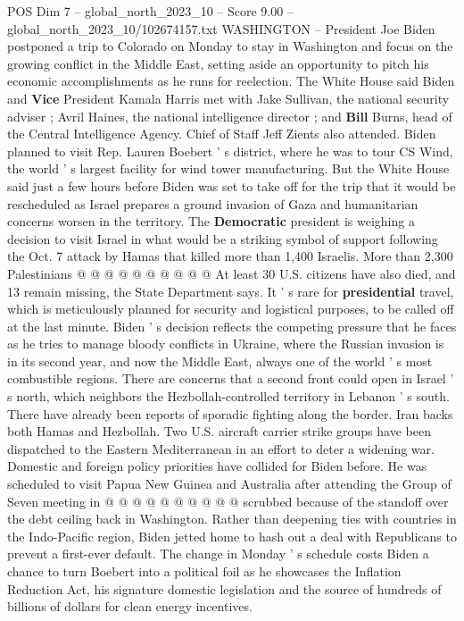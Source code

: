 \begin{textsample}{POS Dim 7 – global\_north\_2023\_10 – Score 9.00 – global\_north\_2023\_10/102674157.txt}  \label{ex:f7_pos_247}
WASHINGTON -- President Joe Biden postponed a trip to Colorado on Monday to stay in Washington and focus on the growing conflict in the Middle East, setting aside an opportunity to pitch his economic accomplishments as he runs for reelection.
The White House said Biden and \textbf{Vice} President Kamala Harris met with Jake Sullivan, the national security adviser ; Avril Haines, the national intelligence director ; and \textbf{Bill} Burns, head of the Central Intelligence Agency.
Chief of Staff Jeff Zients also attended.
Biden planned to visit Rep.
Lauren Boebert ' s district, where he was to tour CS Wind, the world ' s largest facility for wind tower manufacturing.
But the White House said just a few hours before Biden was set to take off for the trip that it would be rescheduled as Israel prepares a ground invasion of Gaza and humanitarian concerns worsen in the territory.
The \textbf{Democratic} president is weighing a decision to visit Israel in what would be a striking symbol of support following the Oct. 7 attack by Hamas that killed more than 1,400 Israelis.
More than 2,300 Palestinians @ @ @ @ @ @ @ @ @ @ At least 30 U.S. citizens have also died, and 13 remain missing, the State Department says.
It ' s rare for \textbf{presidential} travel, which is meticulously planned for security and logistical purposes, to be called off at the last minute.
Biden ' s decision reflects the competing pressure that he faces as he tries to manage bloody conflicts in Ukraine, where the Russian invasion is in its second year, and now the Middle East, always one of the world ' s most combustible regions.
There are concerns that a second front could open in Israel ' s north, which neighbors the Hezbollah-controlled territory in Lebanon ' s south.
There have already been reports of sporadic fighting along the border.
Iran backs both Hamas and Hezbollah.
Two U.S. aircraft carrier strike groups have been dispatched to the Eastern Mediterranean in an effort to deter a widening war.
Domestic and foreign policy priorities have collided for Biden before.
He was scheduled to visit Papua New Guinea and Australia after attending the Group of Seven meeting in @ @ @ @ @ @ @ @ @ @ scrubbed because of the standoff over the debt ceiling back in Washington.
Rather than deepening ties with countries in the Indo-Pacific region, Biden jetted home to hash out a deal with Republicans to prevent a first-ever default.
The change in Monday ' s schedule costs Biden a chance to turn Boebert into a political foil as he showcases the Inflation Reduction Act, his signature domestic legislation and the source of hundreds of billions of dollars for clean energy incentives.

\end{textsample}
